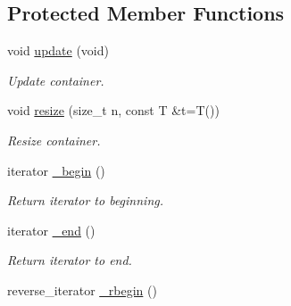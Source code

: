 \subsection*{Protected Member Functions}
\begin{DoxyCompactItemize}
\item 
\hypertarget{classmerlin_1_1set_a772e18b99eaea86f8a78f07cf6263238}{}void \hyperlink{classmerlin_1_1set_a772e18b99eaea86f8a78f07cf6263238}{update} (void)\label{classmerlin_1_1set_a772e18b99eaea86f8a78f07cf6263238}

\begin{DoxyCompactList}\small\item\em Update container. \end{DoxyCompactList}\item 
\hypertarget{classmerlin_1_1set_a9492b2fb9afeea31d559664bb9afcbb3}{}void \hyperlink{classmerlin_1_1set_a9492b2fb9afeea31d559664bb9afcbb3}{resize} (size\+\_\+t n, const T \&t=T())\label{classmerlin_1_1set_a9492b2fb9afeea31d559664bb9afcbb3}

\begin{DoxyCompactList}\small\item\em Resize container. \end{DoxyCompactList}\item 
\hypertarget{classmerlin_1_1set_adc4f7aeff8a337c7b3897b54616849cc}{}iterator \hyperlink{classmerlin_1_1set_adc4f7aeff8a337c7b3897b54616849cc}{\+\_\+begin} ()\label{classmerlin_1_1set_adc4f7aeff8a337c7b3897b54616849cc}

\begin{DoxyCompactList}\small\item\em Return iterator to beginning. \end{DoxyCompactList}\item 
\hypertarget{classmerlin_1_1set_ad87a431a0006ff8608b17515648c8d95}{}iterator \hyperlink{classmerlin_1_1set_ad87a431a0006ff8608b17515648c8d95}{\+\_\+end} ()\label{classmerlin_1_1set_ad87a431a0006ff8608b17515648c8d95}

\begin{DoxyCompactList}\small\item\em Return iterator to end. \end{DoxyCompactList}\item 
\hypertarget{classmerlin_1_1set_ae77c35b12604b58b663e10f3b94799f0}{}reverse\+\_\+iterator \hyperlink{classmerlin_1_1set_ae77c35b12604b58b663e10f3b94799f0}{\+\_\+rbegin} ()\label{classmerlin_1_1set_ae77c35b12604b58b663e10f3b94799f0}


\end{DoxyCompactItemize}
